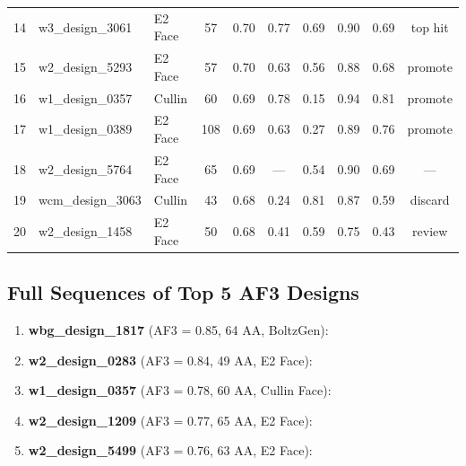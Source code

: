 \documentclass[11pt,a4paper]{article}
\begin{document}
\begin{longtable}{clp{2cm}ccccccc}
14 & w3\_design\_3061  & E2 Face  & 57 & 0.70 & 0.77 & 0.69 & 0.90 & 0.69 & top hit \\
15 & w2\_design\_5293  & E2 Face  & 57 & 0.70 & 0.63 & 0.56 & 0.88 & 0.68 & promote \\
16 & w1\_design\_0357  & Cullin   & 60 & 0.69 & 0.78 & 0.15 & 0.94 & 0.81 & promote \\
17 & w1\_design\_0389  & E2 Face  & 108& 0.69 & 0.63 & 0.27 & 0.89 & 0.76 & promote \\
18 & w2\_design\_5764  & E2 Face  & 65 & 0.69 & ---  & 0.54 & 0.90 & 0.69 & ---     \\
19 & wcm\_design\_3063 & Cullin   & 43 & 0.68 & 0.24 & 0.81 & 0.87 & 0.59 & discard \\
20 & w2\_design\_1458  & E2 Face  & 50 & 0.68 & 0.41 & 0.59 & 0.75 & 0.43 & review  \\
\bottomrule
\end{longtable}

\subsection{Full Sequences of Top 5 AF3 Designs}

\begin{enumerate}
\item \textbf{wbg\_design\_1817} (AF3 = 0.85, 64 AA, BoltzGen):\\
\texttt{}

\item \textbf{w2\_design\_0283} (AF3 = 0.84, 49 AA, E2 Face):\\
\texttt{}

\item \textbf{w1\_design\_0357} (AF3 = 0.78, 60 AA, Cullin Face):\\
\texttt{}

\item \textbf{w2\_design\_1209} (AF3 = 0.77, 65 AA, E2 Face):\\
\texttt{}

\item \textbf{w2\_design\_5499} (AF3 = 0.76, 63 AA, E2 Face):\\
\texttt{}
\end{enumerate}
\end{document}
